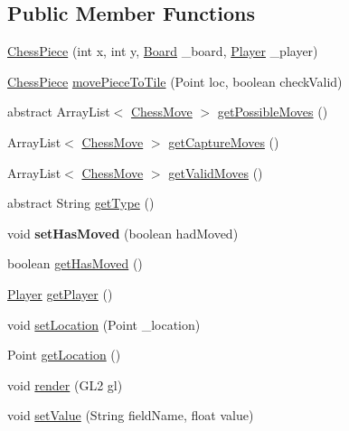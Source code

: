 \subsection*{Public Member Functions}
\begin{DoxyCompactItemize}
\item 
\hyperlink{classmodel_1_1_chess_piece_a67bd82c1cddad23e646cde7505bb5cbb}{Chess\-Piece} (int x, int y, \hyperlink{classmodel_1_1board_1_1_board}{Board} \-\_\-board, \hyperlink{classcontroller_1_1_player}{Player} \-\_\-player)
\item 
\hyperlink{classmodel_1_1_chess_piece}{Chess\-Piece} \hyperlink{classmodel_1_1_chess_piece_af8707e6a255bcb19d1e4936a20e6dc97}{move\-Piece\-To\-Tile} (Point loc, boolean check\-Valid)
\item 
abstract Array\-List$<$ \hyperlink{classmodel_1_1_chess_move}{Chess\-Move} $>$ \hyperlink{classmodel_1_1_chess_piece_a39d690c52727de4a27d2faee4e8b1ac7}{get\-Possible\-Moves} ()
\item 
Array\-List$<$ \hyperlink{classmodel_1_1_chess_move}{Chess\-Move} $>$ \hyperlink{classmodel_1_1_chess_piece_ac47c847341b833c6f3a6fa12c555b859}{get\-Capture\-Moves} ()
\item 
Array\-List$<$ \hyperlink{classmodel_1_1_chess_move}{Chess\-Move} $>$ \hyperlink{classmodel_1_1_chess_piece_a1f7c0c71547a354d71404b8c8a0020ac}{get\-Valid\-Moves} ()
\item 
abstract String \hyperlink{classmodel_1_1_chess_piece_a68308e2fa0fe868f7386d40c6cd925df}{get\-Type} ()
\item 
\hypertarget{classmodel_1_1_chess_piece_ad84ac395de45ea100c9731fb086ef1c0}{void {\bfseries set\-Has\-Moved} (boolean had\-Moved)}\label{classmodel_1_1_chess_piece_ad84ac395de45ea100c9731fb086ef1c0}

\item 
boolean \hyperlink{classmodel_1_1_chess_piece_a085fb407774b223a317d5ad982b88aee}{get\-Has\-Moved} ()
\item 
\hyperlink{classcontroller_1_1_player}{Player} \hyperlink{classmodel_1_1_chess_piece_ac2556be84d4990a806460bbace0610e4}{get\-Player} ()
\item 
void \hyperlink{classmodel_1_1_chess_piece_ad03887b1abfe5503aff3e789f1f15958}{set\-Location} (Point \-\_\-location)
\item 
Point \hyperlink{classmodel_1_1_chess_piece_ae87f373c0666382c92cb644b1a467f6b}{get\-Location} ()
\item 
void \hyperlink{classmodel_1_1_chess_piece_af587b341a0fe842e6aa7562955c33791}{render} (G\-L2 gl)
\item 
void \hyperlink{classmodel_1_1_chess_piece_a9c6576e79cfbc2cc7db4b57569089d1b}{set\-Value} (String field\-Name, float value)
\end{DoxyCompactItemize}
